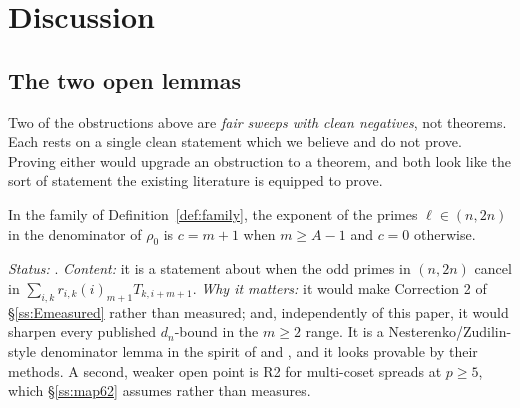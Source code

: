 \section{Discussion}\label{sec:discussion}

\subsection{The two open lemmas}\label{ss:openlemmas}

Two of the obstructions above are \emph{fair sweeps with clean negatives}, not theorems.
Each rests on a single clean statement which we believe and do not prove. Proving either
would upgrade an obstruction to a theorem, and both look like the sort of statement the
existing literature is equipped to prove.

\begin{openlemma}[rule R2]\label{ol:R2}
\OPENC{} In the family of Definition~\ref{def:family}, the exponent of the primes
$\ell\in(n,2n)$ in the denominator of $\rho_0$ is $c=m+1$ when $m\ge A-1$ and $c=0$
otherwise.

\emph{Status:} .
\emph{Content:} it is a statement about when the odd primes in $(n,2n)$ cancel in
$\sum_{i,k}r_{i,k}(i)_{m+1}T_{k,i+m+1}$. \emph{Why it matters:} it would make Correction 2
of \S\ref{ss:Emeasured} \PROVED{} rather than measured; and, independently of this paper, it
would sharpen every published $d_n$-bound in the $m\ge2$ range. It is a
Nesterenko/Zudilin-style denominator lemma in the spirit of
\cite[Lemma 16]{Zudilin2004} and \cite[Lemmas 26--29]{LaiSprang2023}, and it looks provable
by their methods. A second, weaker open point is R2 for multi-coset spreads at $p\ge5$,
which \S\ref{ss:map62} assumes rather than measures.
\end{openlemma}

